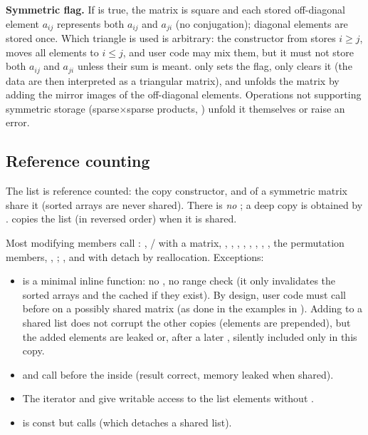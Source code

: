 \textbf{Symmetric flag.} If  is true, the matrix is square and each stored off-diagonal
element $a_{ij}$ represents both $a_{ij}$ and $a_{ji}$ (no conjugation); diagonal elements are stored once.
Which triangle is used is arbitrary: the constructor from  stores $i\ge j$, 
moves all elements to $i\le j$, and user code may mix them, but it must not store both $a_{ij}$ and $a_{ji}$
unless their sum is meant.  only sets the flag,  only clears it
(the data are then interpreted as a triangular matrix), and  unfolds the matrix by
adding the mirror images of the off-diagonal elements. Operations not supporting symmetric storage
(sparse$\times$sparse products, ) unfold it themselves or raise an error.

\subsection{Reference counting}\label{sec:sparse:refcount}
The list is reference counted: the copy constructor,  and  of a symmetric
matrix share it (sorted arrays are never shared). There is \emph{no} ; a deep copy is
obtained by .  copies the list (in reversed
order) when it is shared.

Most modifying members call : , /\code{-=} with a matrix,
, , , , , ,
, , the permutation members, , ; ,
 and  with  detach by reallocation. Exceptions:
\begin{itemize}
\item {} is a minimal inline function: no , no range check (it only invalidates
  the sorted arrays and the cached  if they exist). By design, user code must call
   before  on a possibly shared matrix (as done in the examples in ).
  Adding to a shared list does not corrupt the other copies (elements are prepended), but the added
  elements are leaked or, after a later , silently included only in this copy.
\item {} and  call  before the 
  inside  (result correct, memory leaked when shared).
\item The iterator and  give writable access to the list elements without .
\item {} is const but calls  (which detaches a shared list).
\end{itemize}

